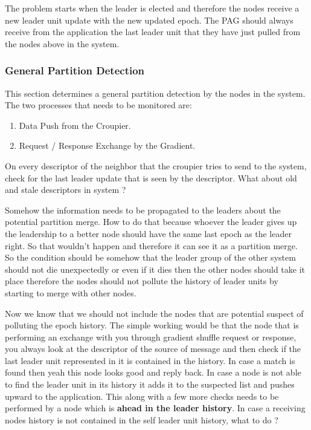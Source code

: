 \documentclass[a4paper, 11pt]{article}
\begin{document}
The problem starts when the leader is elected and therefore the nodes receive a new leader unit update with the new updated epoch. The PAG should always receive from the application the last leader unit that they have just pulled from the nodes above in the system.

\subsubsection{General Partition Detection}
This section determines a general partition detection by the nodes in the system. The two processes that needs to be monitored are:

\begin{enumerate}

\item Data Push from the Croupier.
\item Request / Response Exchange by the Gradient.

\end{enumerate}

On every descriptor of the neighbor that the croupier tries to send to the system, check for the last leader update that is seen by the descriptor. What about old and stale descriptors in system ?

Somehow the information needs to be propagated to the leaders about the potential partition merge. How to do that because whoever the leader gives up the leadership to a better node should have the same last epoch as the leader right. So that wouldn't happen and therefore it can see it as a partition merge. So the condition should be somehow that the leader group of the other system should not die unexpectedly or even if it dies then the other nodes should take it place therefore the nodes should not pollute the history of leader units by starting to merge with other nodes.

Now we know that we should not include the nodes that are potential suspect of polluting the epoch history. The simple working would be that the node that is performing an exchange with you through gradient shuffle request or response, you always look at the descriptor of the source of message and then check if the last leader unit represented in it is contained in the history. In case a match is found then yeah this node looks good and reply back. In case a node is not able to find the leader unit in its history it adds it to the suspected list and pushes upward to the application. This along with a few more checks needs to be performed by a node which is \textbf{ahead in the leader history}. In case a receiving nodes history is not contained in the self leader unit history, what to do ?
\end{document}
